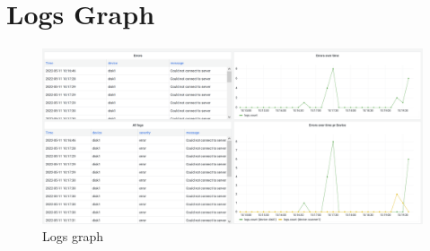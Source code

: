 \onecolumn
\section{Logs Graph}\label{appendix:log-graph}

\begin{figure}[H]
    \centering
    \includegraphics[width=\textwidth]{Image/LoggingGraph.png}
    \caption{Logs graph}
    \label{fig:logs_graph}
\end{figure}